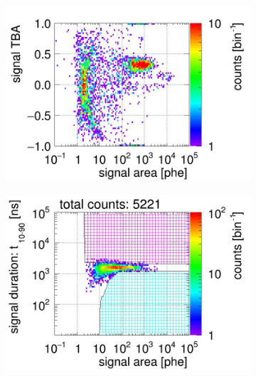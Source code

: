 \begin{landscape}
\begin{figure}[!p]
\begin{subfigure}[t]{0.33\textwidth}
			\includegraphics[width=\figurewidth,clip,trim={0 0 0 40}]{Figures/GasTest/CutsValid/res64769/tbapaX26Vecfig64769.jpg}
			\caption{}
			\label{fig:signal selection dv 14 03}
		\end{subfigure}
		\begin{subfigure}[t]{0.33\textwidth}
			\centering
			\includegraphics[width=\figurewidth,clip,trim={0 98 0 0}]{Figures/GasTest/CutsValid/res64769/pdpa29Vecfig64769.jpg}

\end{subfigure}
\end{figure}
\end{landscape}
